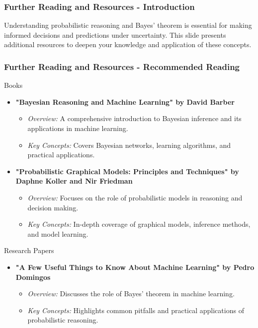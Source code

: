 \documentclass[aspectratio=169]{beamer}
\begin{document}
\begin{frame}[fragile]
    \frametitle{Further Reading and Resources - Introduction}
    Understanding probabilistic reasoning and Bayes' theorem is essential for making informed decisions and predictions under uncertainty. This slide presents additional resources to deepen your knowledge and application of these concepts.
\end{frame}

\begin{frame}[fragile]
    \frametitle{Further Reading and Resources - Recommended Reading}
    \begin{block}{Books}
        \begin{itemize}
            \item \textbf{"Bayesian Reasoning and Machine Learning" by David Barber}
            \begin{itemize}
                \item \textit{Overview:} A comprehensive introduction to Bayesian inference and its applications in machine learning.
                \item \textit{Key Concepts:} Covers Bayesian networks, learning algorithms, and practical applications.
            \end{itemize}
         
            \item \textbf{"Probabilistic Graphical Models: Principles and Techniques" by Daphne Koller and Nir Friedman}
            \begin{itemize}
                \item \textit{Overview:} Focuses on the role of probabilistic models in reasoning and decision making.
                \item \textit{Key Concepts:} In-depth coverage of graphical models, inference methods, and model learning.
            \end{itemize}
        \end{itemize}
    \end{block}
    
    \begin{block}{Research Papers}
        \begin{itemize}
            \item \textbf{"A Few Useful Things to Know About Machine Learning" by Pedro Domingos}
            \begin{itemize}
                \item \textit{Overview:} Discusses the role of Bayes' theorem in machine learning.
                \item \textit{Key Concepts:} Highlights common pitfalls and practical applications of probabilistic reasoning.
            \end{itemize}
        \end{itemize}
    \end{block}
\end{frame}
\end{document}
